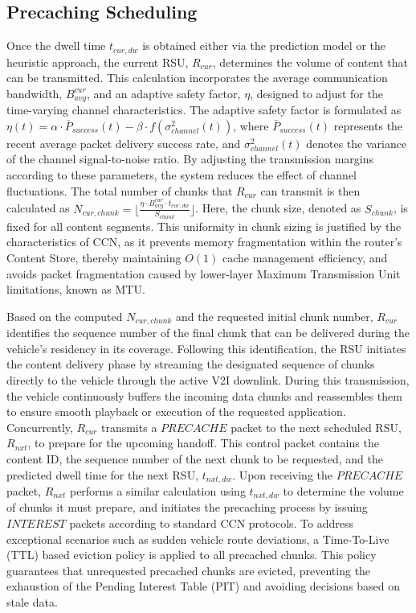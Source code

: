 \documentclass[journal]{IEEEtran}
\begin{document}
\subsection{Precaching Scheduling}

Once the dwell time $t_{cur, dw}$ is obtained either via the prediction model or the heuristic approach, the current RSU, $R_{cur}$, determines the volume of content that can be transmitted. This calculation incorporates the average communication bandwidth, $B_{avg}^{cur}$, and an adaptive safety factor, $\eta$, designed to adjust for the time-varying channel characteristics. The adaptive safety factor is formulated as $\eta(t) = \alpha \cdot \bar{P}_{success}(t) - \beta \cdot f(\sigma_{channel}^2(t))$, where $\bar{P}_{success}(t)$ represents the recent average packet delivery success rate, and $\sigma_{channel}^2(t)$ denotes the variance of the channel signal-to-noise ratio. By adjusting the transmission margins according to these parameters, the system reduces the effect of channel fluctuations. The total number of chunks that $R_{cur}$ can transmit is then calculated as $N_{cur, chunk} = \lfloor \frac{\eta \cdot B_{avg}^{cur} \cdot t_{cur, dw}}{S_{chunk}} \rfloor$. Here, the chunk size, denoted as $S_{chunk}$, is fixed for all content segments. This uniformity in chunk sizing is justified by the characteristics of CCN, as it prevents memory fragmentation within the router's Content Store, thereby maintaining $O(1)$ cache management efficiency, and avoids packet fragmentation caused by lower-layer Maximum Transmission Unit limitations, known as MTU.

Based on the computed $N_{cur, chunk}$ and the requested initial chunk number, $R_{cur}$ identifies the sequence number of the final chunk that can be delivered during the vehicle's residency in its coverage. Following this identification, the RSU initiates the content delivery phase by streaming the designated sequence of chunks directly to the vehicle through the active V2I downlink. During this transmission, the vehicle continuously buffers the incoming data chunks and reassembles them to ensure smooth playback or execution of the requested application. Concurrently, $R_{cur}$ transmits a \(PRECACHE\) packet to the next scheduled RSU, $R_{nxt}$, to prepare for the upcoming handoff. This control packet contains the content ID, the sequence number of the next chunk to be requested, and the predicted dwell time for the next RSU, $t_{nxt, dw}$. Upon receiving the \(PRECACHE\) packet, $R_{nxt}$ performs a similar calculation using $t_{nxt, dw}$ to determine the volume of chunks it must prepare, and initiates the precaching process by issuing \(INTEREST\) packets according to standard CCN protocols. To address exceptional scenarios such as sudden vehicle route deviations, a Time-To-Live (TTL) based eviction policy is applied to all precached chunks. This policy guarantees that unrequested precached chunks are evicted, preventing the exhaustion of the Pending Interest Table (PIT) and avoiding decisions based on stale data.
\end{document}
